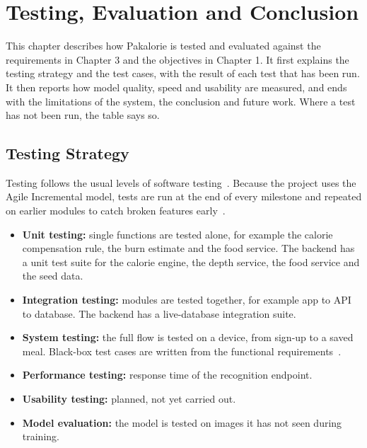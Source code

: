 \chapter{Testing, Evaluation and Conclusion}

This chapter describes how Pakalorie is tested and evaluated against the requirements in Chapter 3 and the
objectives in Chapter 1. It first explains the testing strategy and the test cases, with the result of each test
that has been run. It then reports how model quality, speed and usability are measured, and ends with the
limitations of the system, the conclusion and future work. Where a test has not been run, the table says so.

\section{Testing Strategy}
Testing follows the usual levels of software testing~\cite{test_plan_1,system_test}. Because the project uses the
Agile Incremental model, tests are run at the end of every milestone and repeated on earlier modules to catch
broken features early~\cite{unit_testing}.
\begin{itemize}[noitemsep]
  \item \textbf{Unit testing:} single functions are tested alone, for example the calorie compensation rule, the
        burn estimate and the food service. The backend has a unit test suite for the calorie engine, the depth
        service, the food service and the seed data.
  \item \textbf{Integration testing:} modules are tested together, for example app to API to database. The backend
        has a live-database integration suite.
  \item \textbf{System testing:} the full flow is tested on a device, from sign-up to a saved meal.
        Black-box test cases are written from the functional requirements~\cite{integrate_test}.
  \item \textbf{Performance testing:} response time of the recognition endpoint.
  \item \textbf{Usability testing:} planned, not yet carried out.
  \item \textbf{Model evaluation:} the model is tested on images it has not seen during training.
\end{itemize}


